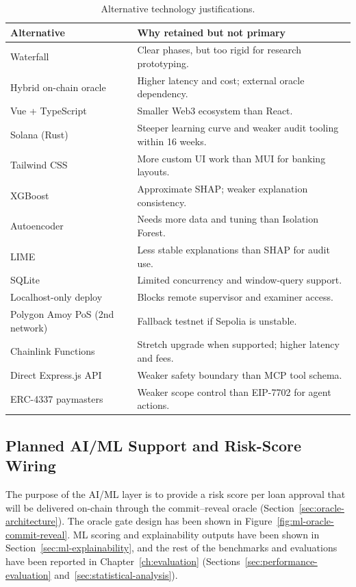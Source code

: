 \documentclass[12pt,a4paper]{report}
\newcommand{\tableheadcolor}{\rowcolor{TableHeadBg}}
\begin{document}
\begin{table}[H]
\centering
\caption[Alternative technology justifications]{Alternative technology justifications.}
\label{tab:tech-justification-alternatives}
\small
\begin{tabular}{@{}p{3.2cm}p{9.8cm}@{}}
\toprule
\tableheadcolor
\textbf{Alternative} & \textbf{Why retained but not primary} \\
\midrule
Waterfall & Clear phases, but too rigid for research prototyping. \\
Hybrid on-chain oracle & Higher latency and cost; external oracle dependency. \\
Vue + TypeScript & Smaller Web3 ecosystem than React. \\
Solana (Rust) & Steeper learning curve and weaker audit tooling within 16 weeks. \\
Tailwind CSS & More custom UI work than MUI for banking layouts. \\
XGBoost & Approximate SHAP; weaker explanation consistency. \\
Autoencoder & Needs more data and tuning than Isolation Forest. \\
LIME & Less stable explanations than SHAP for audit use. \\
SQLite & Limited concurrency and window-query support. \\
Localhost-only deploy & Blocks remote supervisor and examiner access. \\
Polygon Amoy PoS (2nd network) & Fallback testnet if Sepolia is unstable. \\
Chainlink Functions & Stretch upgrade when supported; higher latency and fees. \\
Direct Express.js API & Weaker safety boundary than MCP tool schema. \\
ERC-4337 paymasters & Weaker scope control than EIP-7702 for agent actions. \\
\bottomrule
\end{tabular}
\end{table}

\subsection{Planned AI/ML Support and Risk-Score Wiring}
\label{sec:aiml-support}

The purpose of the AI/ML layer is to provide a risk score per loan approval that will be delivered on-chain through the commit--reveal oracle (Section~\ref{sec:oracle-architecture}). The oracle gate design has been shown in Figure~\ref{fig:ml-oracle-commit-reveal}. ML scoring and explainability outputs have been shown in Section~\ref{sec:ml-explainability}, and the rest of the benchmarks and evaluations have been reported in Chapter~\ref{ch:evaluation} (Sections~\ref{sec:performance-evaluation} and~\ref{sec:statistical-analysis}).
\end{document}
